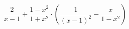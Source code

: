 \begin{ex}[type=expression]
	\begin{condition}
		\( \dfrac{2}{x-1}+\dfrac{1-x^2}{1+x^2}\cdot\left( \dfrac{1}{(x-1)^2}-\dfrac{x}{1-x^2} \right) \)
	\end{condition}
\end{ex}